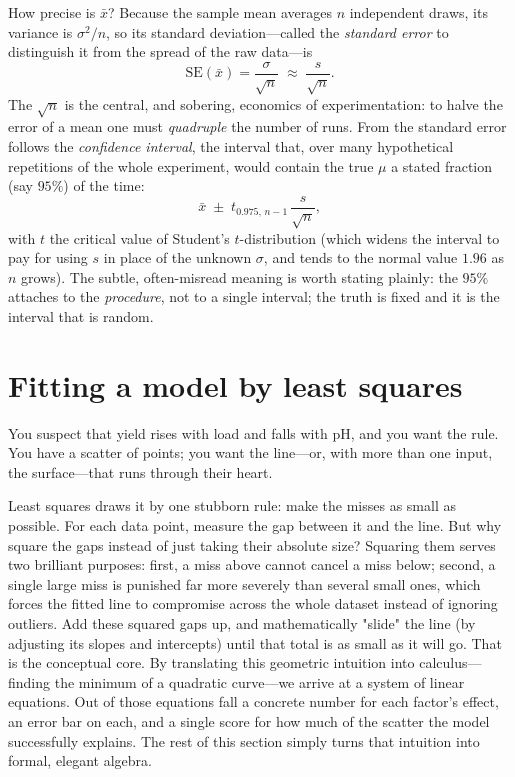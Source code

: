 How precise is $\bar x$? Because the sample mean averages $n$ independent draws,
its variance is $\sigma^2/n$, so its standard deviation---called the
\emph{standard error} to distinguish it from the spread of the raw data---is
%
\begin{equation}
\mathrm{SE}(\bar x) = \frac{\sigma}{\sqrt n}\;\approx\;\frac{s}{\sqrt n}.
\label{eq:se}
\end{equation}
%
The $\sqrt n$ is the central, and sobering, economics of experimentation: to
halve the error of a mean one must \emph{quadruple} the number of runs. From the
standard error follows the \emph{confidence interval}, the interval that, over
many hypothetical repetitions of the whole experiment, would contain the true
$\mu$ a stated fraction (say $95\%$) of the time:
%
\begin{equation}
\bar x \;\pm\; t_{0.975,\,n-1}\,\frac{s}{\sqrt n},
\label{eq:ci}
\end{equation}
%
with $t$ the critical value of Student's $t$-distribution (which widens the
interval to pay for using $s$ in place of the unknown $\sigma$, and tends to the
normal value $1.96$ as $n$ grows). The subtle, often-misread meaning is worth
stating plainly: the $95\%$ attaches to the \emph{procedure}, not to a single
interval; the truth is fixed and it is the interval that is random.

\section{Fitting a model by least squares}
\label{sec:stats-ols}

You suspect that yield rises with load and falls with pH, and you want the rule.
You have a scatter of points; you want the line---or, with more than one input,
the surface---that runs through their heart.

Least squares draws it by one stubborn rule: make the misses as small as
possible. For each data point, measure the gap between it and the line. But why square the gaps instead of just taking their absolute size?
Squaring them serves two brilliant purposes: first, a miss above cannot cancel a miss below; second, a single large miss is punished far more severely than several small ones, which forces the fitted line to compromise across the whole dataset instead of ignoring outliers. Add these squared gaps up, and mathematically "slide" the line (by adjusting its slopes and intercepts) until that total is as small as it will go. That is the conceptual core. By translating this geometric intuition into calculus---finding the minimum of a quadratic curve---we arrive at a system of linear equations. Out of those equations fall a concrete number for each factor's effect, an error bar on each, and a single score for how much of the scatter the model successfully explains. The rest of this section simply turns that intuition into formal, elegant algebra.

